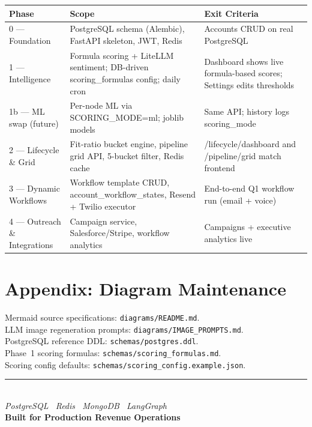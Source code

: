\documentclass[11pt,a4paper]{article}
\begin{document}
\begin{longtable}{@{}p{2.5cm}p{5cm}p{5cm}@{}}
\toprule
\textbf{Phase} & \textbf{Scope} & \textbf{Exit Criteria} \\
\midrule
\endhead
0 --- Foundation & PostgreSQL schema (Alembic), FastAPI skeleton, JWT, Redis & Accounts CRUD on real PostgreSQL \\
1 --- Intelligence & Formula scoring + LiteLLM sentiment; DB-driven scoring\_formulas config; daily cron & Dashboard shows live formula-based scores; Settings edits thresholds \\
1b --- ML swap (future) & Per-node ML via SCORING\_MODE=ml; joblib models & Same API; history logs scoring\_mode \\
2 --- Lifecycle \& Grid & Fit-ratio bucket engine, pipeline grid API, 5-bucket filter, Redis cache & /lifecycle/dashboard and /pipeline/grid match frontend \\
3 --- Dynamic Workflows & Workflow template CRUD, account\_workflow\_states, Resend + Twilio executor & End-to-end Q1 workflow run (email + voice) \\
4 --- Outreach \& Integrations & Campaign service, Salesforce/Stripe, workflow analytics & Campaigns + executive analytics live \\
\bottomrule
\end{longtable}

\section{Appendix: Diagram Maintenance}

Mermaid source specifications: \texttt{diagrams/README.md}.\\
LLM image regeneration prompts: \texttt{diagrams/IMAGE\_PROMPTS.md}.\\
PostgreSQL reference DDL: \texttt{schemas/postgres.ddl}.\\
Phase~1 scoring formulas: \texttt{schemas/scoring\_formulas.md}.\\
Scoring config defaults: \texttt{schemas/scoring\_config.example.json}.

\vspace{1.5em}
\begin{center}
    {\color{brandblue}\rule{0.6\textwidth}{1.5pt}}\\[0.5em]
    \textit{PostgreSQL \textperiodcentered\ Redis \textperiodcentered\ MongoDB \textperiodcentered\ LangGraph}\\[0.3em]
    \textbf{\color{brandblue}Built for Production Revenue Operations}
\end{center}
\end{document}
